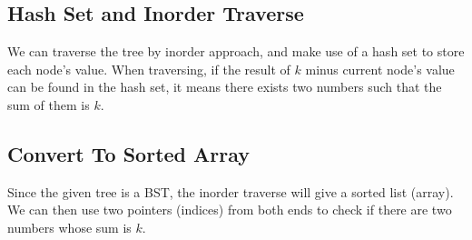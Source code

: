 \subsection{Hash Set and Inorder Traverse}
We can traverse the tree by inorder approach, and make use of a hash set to store each node's value. When traversing, if the result of $k$ minus current node's value can be found in the hash set, it means there exists two numbers such that the sum of them is $k$.

\subsection{Convert To Sorted Array}
Since the given tree is a BST, the inorder traverse will give a sorted list (array). We can then use two pointers (indices) from both ends to check if there are two numbers whose sum is $k$.
